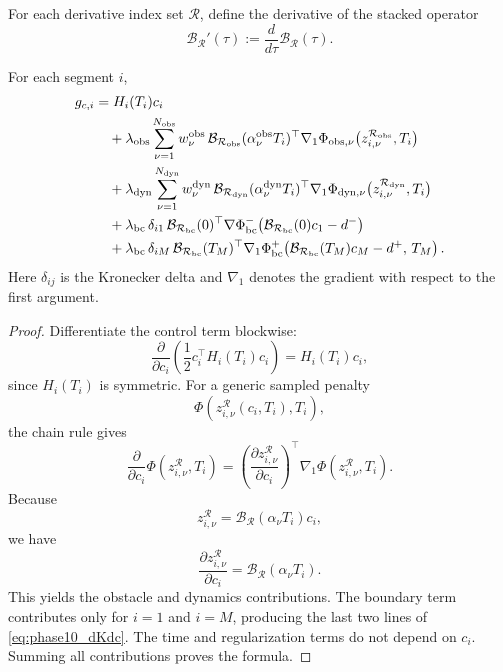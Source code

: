 For each derivative index set \(\mathcal R\), define the derivative of the stacked operator
\[
\mathcal B_{\mathcal R}'(\tau)
:=
\frac{d}{d\tau}\mathcal B_{\mathcal R}(\tau).
\]

\begin{proposition}
\label{prop:phase10_dKdc}
For each segment \(i\),
\begin{align}
\label{eq:phase10_dKdc}
g_{c,i}
&=
H_i(T_i)c_i \notag\\
&\quad
+\lambda_{\mathrm{obs}}
\sum_{\nu=1}^{N_{\mathrm{obs}}}
w_\nu^{\mathrm{obs}}
\,
\mathcal B_{\mathcal R_{\mathrm{obs}}}(\alpha_\nu^{\mathrm{obs}}T_i)^\top
\nabla_1 \Phi_{\mathrm{obs},\nu}
\bigl(
z_{i,\nu}^{\mathcal R_{\mathrm{obs}}},T_i
\bigr)
\notag\\
&\quad
+\lambda_{\mathrm{dyn}}
\sum_{\nu=1}^{N_{\mathrm{dyn}}}
w_\nu^{\mathrm{dyn}}
\,
\mathcal B_{\mathcal R_{\mathrm{dyn}}}(\alpha_\nu^{\mathrm{dyn}}T_i)^\top
\nabla_1 \Phi_{\mathrm{dyn},\nu}
\bigl(
z_{i,\nu}^{\mathcal R_{\mathrm{dyn}}},T_i
\bigr)
\notag\\
&\quad
+\lambda_{\mathrm{bc}}\,\delta_{i1}\,
\mathcal B_{\mathcal R_{\mathrm{bc}}}(0)^\top
\nabla \Phi_{\mathrm{bc}}^-
\!\left(
\mathcal B_{\mathcal R_{\mathrm{bc}}}(0)c_1-d^-
\right)
\notag\\
&\quad
+\lambda_{\mathrm{bc}}\,\delta_{iM}\,
\mathcal B_{\mathcal R_{\mathrm{bc}}}(T_M)^\top
\nabla_1 \Phi_{\mathrm{bc}}^+
\!\left(
\mathcal B_{\mathcal R_{\mathrm{bc}}}(T_M)c_M-d^+,\,T_M
\right).
\end{align}
Here \(\delta_{ij}\) is the Kronecker delta and \(\nabla_1\) denotes the gradient with respect to the first argument.
\end{proposition}

\begin{proof}
Differentiate the control term blockwise:
\[
\frac{\partial}{\partial c_i}
\left(\frac12 c_i^\top H_i(T_i)c_i\right)=H_i(T_i)c_i,
\]
since \(H_i(T_i)\) is symmetric.
For a generic sampled penalty
\[
\Phi(z_{i,\nu}^{\mathcal R}(c_i,T_i),T_i),
\]
the chain rule gives
\[
\frac{\partial}{\partial c_i}\Phi(z_{i,\nu}^{\mathcal R},T_i)
=
\left(\frac{\partial z_{i,\nu}^{\mathcal R}}{\partial c_i}\right)^\top
\nabla_1 \Phi(z_{i,\nu}^{\mathcal R},T_i).
\]
Because
\[
z_{i,\nu}^{\mathcal R}
=
\mathcal B_{\mathcal R}(\alpha_\nu T_i)c_i,
\]
we have
\[
\frac{\partial z_{i,\nu}^{\mathcal R}}{\partial c_i}
=
\mathcal B_{\mathcal R}(\alpha_\nu T_i).
\]
This yields the obstacle and dynamics contributions.
The boundary term contributes only for \(i=1\) and \(i=M\), producing the last two lines of \eqref{eq:phase10_dKdc}.
The time and regularization terms do not depend on \(c_i\).
Summing all contributions proves the formula.
\end{proof}

